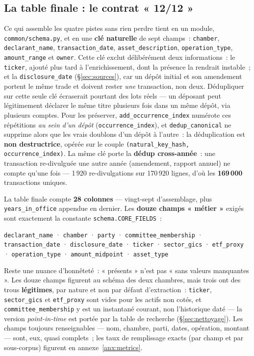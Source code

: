 \documentclass[11pt,a4paper]{article}
\newcommand{\co}[1]{\texttt{\small #1}}
\begin{document}
\subsection{La table finale : le contrat « 12/12 »}
\label{sec:table}
Ce qui assemble les quatre pistes sans rien perdre tient en un module, \co{common/schema.py}, et en une
\textbf{clé naturelle} de sept champs~: \co{chamber}, \co{declarant_name}, \co{transaction_date},
\co{asset_description}, \co{operation_type}, \co{amount_range} et \co{owner}. Cette clé exclut délibérément
deux informations~: le \co{ticker}, ajouté plus tard à l'enrichissement, dont la présence la rendrait
instable~; et la \co{disclosure_date} (\S{}\ref{sec:sources}), car un dépôt initial et son amendement portent
le même trade et doivent rester \emph{une} transaction, non deux. Dédupliquer sur cette seule clé écraserait
pourtant des lots réels — un déposant peut légitimement déclarer le même titre plusieurs fois dans un même
dépôt, via plusieurs comptes. Pour les préserver, \co{add_occurrence_index} numérote ces répétitions
\emph{au sein d'un dépôt} (\co{occurrence_index}), et \co{dedup_canonical} ne supprime alors que les vrais
doublons d'un dépôt à l'autre~: la déduplication est \textbf{non destructrice}, opérée sur le couple
\co{(natural_key_hash, occurrence_index)}. La même clé porte la \textbf{dédup cross-année}~: une
transaction re-divulguée une autre année (amendement, rapport annuel) ne compte qu'une fois — 1\,920
re-divulgations sur 170\,920 lignes, d'où les \textbf{169\,000} transactions uniques.

La table finale compte \textbf{28 colonnes} — vingt-sept d'assemblage, plus \co{years_in_office} appendue en
dernier. Les \textbf{douze champs « métier »} exigés sont exactement la constante \co{schema.CORE_FIELDS}~:
\begin{center}\small
\co{declarant_name} · \co{chamber} · \co{party} · \co{committee_membership} · \co{transaction_date} ·
\co{disclosure_date} · \co{ticker} · \co{sector_gics} · \co{etf_proxy} · \co{operation_type} ·
\co{amount_midpoint} · \co{asset_type}
\end{center}

Reste une nuance d'honnêteté~: « présents » n'est pas « sans valeurs manquantes ». Les douze champs figurent
au schéma des deux chambres, mais trois ont des trous \textbf{légitimes}, par nature et non par défaut
d'extraction~: \co{ticker}, \co{sector_gics} et \co{etf_proxy} sont vides pour les actifs non cotés, et
\co{committee_membership} y est un instantané courant, non l'historique daté — la version
\emph{point-in-time} est portée par la table de recherche (\S{}\ref{sec:nettoyage}). Les champs toujours
renseignables — nom, chambre, parti, dates, opération, montant — sont, eux, quasi complets~; les taux de
remplissage exacts (par champ et par sous-corpus) figurent en annexe~\ref{anx:metrics}.
\end{document}
